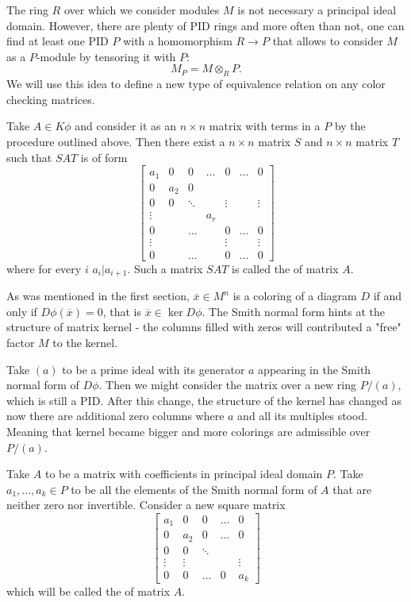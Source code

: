 The ring $R$ over which we consider modules $M$ is not necessary a principal ideal domain. However, there are plenty of PID rings and more often than not, one can find at least one PID $P$ with a homomorphism $R\to P$ that allows to consider $M$ as a $P$-module by tensoring it with $P$:
$$M_P=M\otimes_R P.$$
We will use this idea to define a new type of equivalence relation on any color checking matrices.

\begin{definition}
Take $A\in K\phi$ and consider it as an $n\times n$ matrix with terms in a $P$ by the procedure outlined above. Then there exist a $n\times n$ matrix $S$ and $n\times n$ matrix $T$ such that $SAT$ is of form
$$
\begin{bmatrix}
  a_1 & 0 & 0 & \hdots & 0 & \hdots & 0 \\ 
  0 & a_2 & 0\\ 
  0 & 0 & \ddots & & \vdots & & \vdots\\ 
  \vdots & & & a_r\\ 
  0 & & \hdots & & 0 & \hdots & 0 \\ 
  \vdots & & & & \vdots & & \vdots\\ 
  0 & & \hdots & & 0 & \hdots & 0
\end{bmatrix}
$$
where for every $i$ $a_i|a_{i+1}$. Such a matrix $SAT$ is called the  of matrix $A$.
\end{definition}

As was mentioned in the first section, $\overline{x}\in M^n$ is a coloring of a diagram $D$ if and only if $D\phi(\overline{x})=0$, that is $\overline{x}\in\ker D\phi$. The Smith normal form hints at the structure of matrix kernel - the columns filled with zeros will contributed a "free" factor $M$ to the kernel. 

Take $(a)$ to be a prime ideal with its generator $a$ appearing in the Smith normal form of $D\phi$. Then we might consider the matrix over a new ring $P/(a)$, which is still a PID. After this change, the structure of the kernel has changed as now there are additional zero columns where $a$ and all its multiples stood. Meaning that kernel became bigger and more colorings are admissible over $P/(a)$.

\begin{definition}\label{reduced normal form def}
  Take $A$ to be a matrix with coefficients in principal ideal domain $P$. Take $a_1,...,a_k\in P$ to be all the elements of the Smith normal form of $A$ that are neither zero nor invertible. Consider a new square matrix 
  $$
  \begin{bmatrix}
    a_1 & 0 & 0 & \hdots & 0\\ 
    0 & a_2 & 0 & \hdots & 0 \\ 
    0 & 0 & \ddots & &  \\ 
    \vdots & \vdots & & & \vdots \\ 
    0 & 0 & \hdots & 0 & a_k
  \end{bmatrix}
  $$
  which will be called the  of matrix $A$.
\end{definition}


